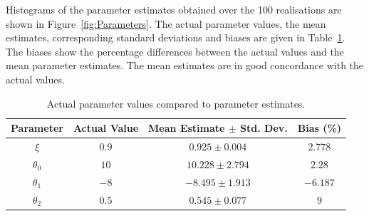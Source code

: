 \documentclass[10pt]{article}
\begin{document}
Histograms of the parameter estimates obtained over the 100 realisations are shown in Figure~\ref{fig:Parameters}. The actual parameter values, the mean estimates, corresponding standard deviations and biases are given in Table~\ref{tab:Parameters estimates}. The biases show the percentage differences between the actual values and the mean parameter estimates. The mean estimates are in good concordance with the actual values. 
\begin{table}
\centering
\begin{tabular}{cccc}
	\hline\hline Parameter & Actual Value & Mean Estimate $\pm$ Std. Dev. & Bias (\%) \\
	\hline\hline
 	$\xi$ & $0.9$ & $0.925\pm 0.004$ & $2.778$ \\
	$\theta_0$ & $10$ & $10.228\pm2.794$ & $2.28$\\
	$\theta_1$ & $-8$ & $-8.495\pm1.913$ & $-6.187$\\
	$\theta_2$ & $0.5$ & $0.545\pm0.077$ & $9$\\
\hline\hline
\end{tabular}
\caption{Actual parameter values compared to parameter estimates.}
\label{tab:Parameters estimates}
\end{table}
\end{document}
